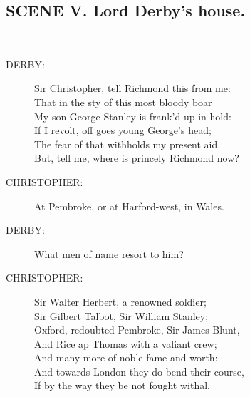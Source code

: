 \documentclass{article}
\begin{document}
\subsection*{SCENE V.  Lord Derby's house.}
\\
\begin{description}
\item[DERBY:] 
\hspace{1pt}Sir Christopher, tell Richmond this from me:\\
\hspace{1pt}That in the sty of this most bloody boar\\
\hspace{1pt}My son George Stanley is frank'd up in hold:\\
\hspace{1pt}If I revolt, off goes young George's head;\\
\hspace{1pt}The fear of that withholds my present aid.\\
\hspace{1pt}But, tell me, where is princely Richmond now?\\
\end{description}
\begin{description}
\item[CHRISTOPHER:] 
\hspace{1pt}At Pembroke, or at Harford-west, in Wales.\\
\end{description}
\begin{description}
\item[DERBY:] 
\hspace{1pt}What men of name resort to him?\\
\end{description}
\begin{description}
\item[CHRISTOPHER:] 
\hspace{1pt}Sir Walter Herbert, a renowned soldier;\\
\hspace{1pt}Sir Gilbert Talbot, Sir William Stanley;\\
\hspace{1pt}Oxford, redoubted Pembroke, Sir James Blunt,\\
\hspace{1pt}And Rice ap Thomas with a valiant crew;\\
\hspace{1pt}And many more of noble fame and worth:\\
\hspace{1pt}And towards London they do bend their course,\\
\hspace{1pt}If by the way they be not fought withal.\\
\end{description}
\end{document}
